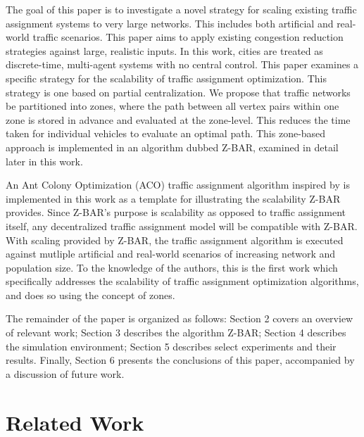 \documentclass[conference]{IEEEtran}
\begin{document}
The goal of this paper is to investigate a novel strategy for scaling existing traffic assignment systems to very large networks. This includes both artificial and real-world traffic scenarios. This paper aims to apply existing congestion reduction strategies against large, realistic inputs. In this work, cities are treated as discrete-time, multi-agent systems with no central control. This paper examines a specific strategy for the scalability of traffic assignment optimization. This strategy is one based on partial centralization. We propose that traffic networks be partitioned into zones, where the path between all vertex pairs within one zone is stored in advance and evaluated at the zone-level. This reduces the time taken for individual vehicles to evaluate an optimal path. This zone-based approach is implemented in an algorithm dubbed Z-BAR, examined in detail later in this work.

An Ant Colony Optimization (ACO) traffic assignment algorithm inspired by \cite{iaco} is implemented in this work as a template for illustrating the scalability Z-BAR provides. Since Z-BAR's purpose is scalability as opposed to traffic assignment itself, any decentralized traffic assignment model will be compatible with Z-BAR. With scaling provided by Z-BAR, the traffic assignment algorithm is executed against mutliple artificial and real-world scenarios of increasing network and population size. To the knowledge of the authors, this is the first work which specifically addresses the scalability of traffic assignment optimization algorithms, and does so using the concept of zones.

The remainder of the paper is organized as follows: Section 2 covers an overview of relevant work; Section 3 describes the algorithm Z-BAR; Section 4 describes the simulation environment; Section 5 describes select experiments and their results. Finally, Section 6 presents the conclusions of this paper, accompanied by a discussion of future work.


\section{Related Work} %
\end{document}
